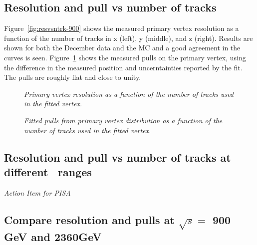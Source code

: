 \subsection{Resolution and pull vs number of tracks}


Figure~\ref{fig:resvsntrk-900} shows the measured primary vertex 
resolution as a function of the number of tracks in x (left), 
y (middle), and z (right). 
Results are shown for both the December data and the MC and 
a good agreement in the curves is seen. 
Figure~\ref{fig:pullvsntrk-900} shows the measured pulls on the 
primary vertex, using the difference in the measured position and 
uncerntainties reported by the fit. 
The pulls are roughly flat and close to unity.

\begin{figure}[htb]
\begin{center}
\centerline{
}
\caption{\sl
Primary vertex resolution as a function of the number of tracks used in the 
fitted vertex.
}
\label{fig:resvsntrk-900}
\end{center}
\begin{center}
\centerline{
}
\caption{\sl
Fitted pulls from primary vertex distribution as a function of the number of tracks used in the 
fitted vertex.}
\label{fig:pullvsntrk-900}
\end{center}
\end{figure}



\subsection{Resolution and pull vs number of tracks at different \pt\, ranges}

{\it Action Item for PISA}

\subsection{Compare resolution and pulls at $\sqrt{s}=$ 900 GeV and 2360GeV}

